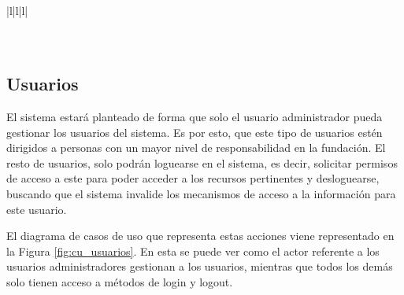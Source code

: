 \begin{table}[H]
{\begin{tabular}{|l|l|l|}
            \hline
                                                                                                                                                                                                                                                                                              \\ 
            \hline
                                                                                                                                                                                                                                    \\ 
            \hline
                                                                                                                                                                 \\
            \hline
        \end{tabular}
    }
    \caption{Descripción del usuario invitado}
\end{table}

\subsection{Usuarios}

El sistema estará planteado de forma que solo el usuario administrador pueda gestionar los usuarios del sistema. Es por esto, que este tipo de usuarios estén dirigidos a personas con un mayor nivel de responsabilidad en la fundación. El resto de usuarios, solo podrán loguearse en el sistema, es decir, solicitar permisos de acceso a este para poder acceder a los recursos pertinentes y desloguearse, buscando que el sistema invalide los mecanismos de acceso a la información para este usuario.

El diagrama de casos de uso que representa estas acciones viene representado en la Figura \ref{fig:cu_usuarios}. En esta se puede ver como el actor referente a los usuarios administradores gestionan a los usuarios, mientras que todos los demás solo tienen acceso a métodos de login y logout. 

